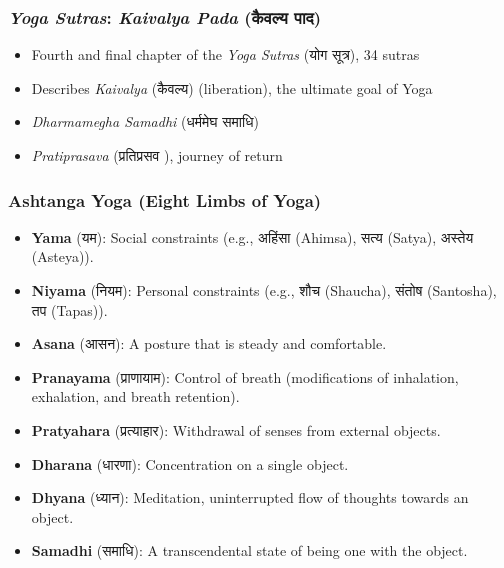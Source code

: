 \begin{frame}[fragile]\frametitle{\textit{Yoga Sutras}: \textit{Kaivalya Pada} (कैवल्य पाद)}

    \begin{itemize}
        \item Fourth and final chapter of the \textit{Yoga Sutras} (योग सूत्र), 34 sutras
        \item Describes \textit{Kaivalya} (कैवल्य) (liberation), the ultimate goal of Yoga
        \item \textit{Dharmamegha Samadhi} (धर्ममेघ समाधि)
        \item \textit{Pratiprasava} (प्रतिप्रसव ), journey of return
    \end{itemize}

\end{frame}



\begin{frame}[fragile]\frametitle{Ashtanga Yoga (Eight Limbs of Yoga)}
    \begin{itemize}
        \item \textbf{Yama} (यम): Social constraints (e.g., अहिंसा (Ahimsa), सत्य (Satya), अस्तेय (Asteya)).
        \item \textbf{Niyama} (नियम): Personal constraints (e.g., शौच (Shaucha), संतोष (Santosha), तप (Tapas)).
        \item \textbf{Asana} (आसन): A posture that is steady and comfortable.
        \item \textbf{Pranayama} (प्राणायाम): Control of breath (modifications of inhalation, exhalation, and breath retention).
        \item \textbf{Pratyahara} (प्रत्याहार): Withdrawal of senses from external objects.
        \item \textbf{Dharana} (धारणा): Concentration on a single object.
        \item \textbf{Dhyana} (ध्यान): Meditation, uninterrupted flow of thoughts towards an object.
        \item \textbf{Samadhi} (समाधि): A transcendental state of being one with the object.
    \end{itemize}
\end{frame}


